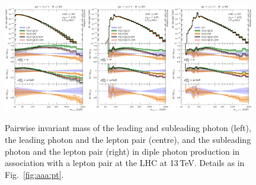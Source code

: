 \begin{figure}[t!]
  \centering
  \includegraphics[width=0.32\textwidth]{figs_aaz/m_y1y2_comb_log}
  \includegraphics[width=0.32\textwidth]{figs_aaz/m_y1l1l2_comb_log}
  \includegraphics[width=0.32\textwidth]{figs_aaz/m_y2l1l2_comb_log}
  \caption{
    Pairwise invariant mass of the leading and subleading photon (left),
    the leading photon and the lepton pair (centre), and the subleading 
    photon and the lepton pair (right)
    in diple photon production in association with a lepton pair 
    at the LHC at 13\,TeV. 
    Details as in Fig.\ \ref{fig:aaa:pt}.
    \label{fig:aaz:myy}
  }
\end{figure}


